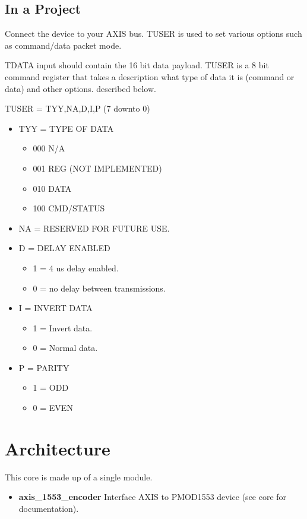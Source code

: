 

\subsection{In a Project}
\par
Connect the device to your AXIS bus. TUSER is used to set various options such as command/data packet mode.

\par
TDATA input should contain the 16 bit data payload. TUSER is a 8 bit command register
that takes a description what type of data it is (command or data) and other options.
described below.

TUSER = {TYY,NA,D,I,P} (7 downto 0)
\begin{itemize}
\item TYY = TYPE OF DATA
  \begin{itemize}
    \item 000 N/A
    \item 001 REG (NOT IMPLEMENTED)
    \item 010 DATA
    \item 100 CMD/STATUS
  \end{itemize}
  \item NA = RESERVED FOR FUTURE USE.
  \item D = DELAY ENABLED
  \begin{itemize}
    \item 1 = 4 us delay enabled.
    \item 0 = no delay between transmissions.
  \end{itemize}
  \item I = INVERT DATA
  \begin{itemize}
    \item 1 = Invert data.
    \item 0 = Normal data.
  \end{itemize}
  \item P = PARITY
  \begin{itemize}
    \item 1 = ODD
    \item 0 = EVEN
  \end{itemize}
\end{itemize}

\section{Architecture}
\par
This core is made up of a single module.
\begin{itemize}
  \item \textbf{axis\_1553\_encoder} Interface AXIS to PMOD1553 device (see core for documentation).
\end{itemize}

